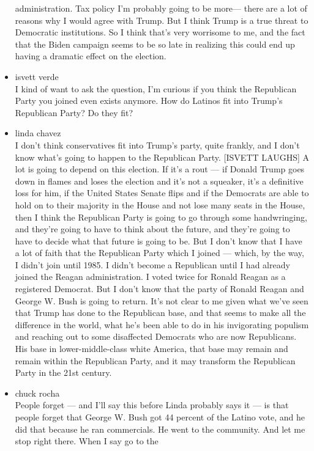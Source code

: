 \begin{itemize}
  administration. Tax policy I'm probably going to be more--- there are
  a lot of reasons why I would agree with Trump. But I think Trump is a
  true threat to Democratic institutions. So I think that's very
  worrisome to me, and the fact that the Biden campaign seems to be so
  late in realizing this could end up having a dramatic effect on the
  election.
\item
  isvett verde\\
  I kind of want to ask the question, I'm curious if you think the
  Republican Party you joined even exists anymore. How do Latinos fit
  into Trump's Republican Party? Do they fit?
\item
  linda chavez\\
  I don't think conservatives fit into Trump's party, quite frankly, and
  I don't know what's going to happen to the Republican Party. {[}ISVETT
  LAUGHS{]} A lot is going to depend on this election. If it's a rout
  --- if Donald Trump goes down in flames and loses the election and
  it's not a squeaker, it's a definitive loss for him, if the United
  States Senate flips and if the Democrats are able to hold on to their
  majority in the House and not lose many seats in the House, then I
  think the Republican Party is going to go through some handwringing,
  and they're going to have to think about the future, and they're going
  to have to decide what that future is going to be. But I don't know
  that I have a lot of faith that the Republican Party which I joined
  --- which, by the way, I didn't join until 1985. I didn't become a
  Republican until I had already joined the Reagan administration. I
  voted twice for Ronald Reagan as a registered Democrat. But I don't
  know that the party of Ronald Reagan and George W. Bush is going to
  return. It's not clear to me given what we've seen that Trump has done
  to the Republican base, and that seems to make all the difference in
  the world, what he's been able to do in his invigorating populism and
  reaching out to some disaffected Democrats who are now Republicans.
  His base in lower-middle-class white America, that base may remain and
  remain within the Republican Party, and it may transform the
  Republican Party in the 21st century.
\item
  chuck rocha\\
  People forget --- and I'll say this before Linda probably says it ---
  is that people forget that George W. Bush got 44 percent of the Latino
  vote, and he did that because he ran commercials. He went to the
  community. And let me stop right there. When I say go to the

\end{itemize}

